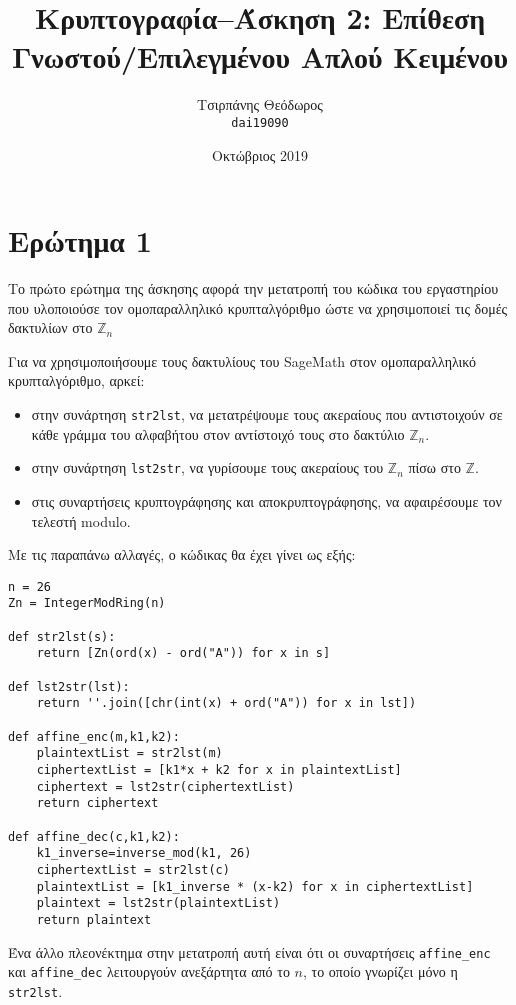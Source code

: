\documentclass{article}
\title{Κρυπτογραφία--Άσκηση 2: Επίθεση Γνωστού/Επιλεγμένου Απλού Κειμένου}
\author{Τσιρπάνης Θεόδωρος\\ \texttt{dai19090}}
\date{Οκτώβριος 2019}
\begin{document}
\maketitle

\section*{Ερώτημα 1}

Το πρώτο ερώτημα της άσκησης αφορά την μετατροπή του κώδικα του εργαστηρίου που υλοποιούσε τον ομοπαραλληλικό κρυπταλγόριθμο ώστε να χρησιμοποιεί τις δομές δακτυλίων στο $\mathbb{Z}_n$

Για να χρησιμοποιήσουμε τους δακτυλίους του SageMath στον ομοπαραλληλικό κρυπταλγόριθμο, αρκεί:

\begin{itemize}
\item στην συνάρτηση \lstinline|str2lst|, να μετατρέψουμε τους ακεραίους που αντιστοιχούν σε κάθε γράμμα του αλφαβήτου στον αντίστοιχό τους στο δακτύλιο $\mathbb{Z}_n$.

\item στην συνάρτηση \lstinline|lst2str|, να γυρίσουμε τους ακεραίους του $\mathbb{Z}_n$ πίσω στο $\mathbb{Z}$.

\item στις συναρτήσεις κρυπτογράφησης και αποκρυπτογράφησης, να αφαιρέσουμε τον τελεστή modulo.
\end{itemize}

Με τις παραπάνω αλλαγές, ο κώδικας θα έχει γίνει ως εξής:

\begin{lstlisting}
n = 26
Zn = IntegerModRing(n)

def str2lst(s):
    return [Zn(ord(x) - ord("A")) for x in s]

def lst2str(lst):
    return ''.join([chr(int(x) + ord("A")) for x in lst])

def affine_enc(m,k1,k2):
    plaintextList = str2lst(m)
    ciphertextList = [k1*x + k2 for x in plaintextList]
    ciphertext = lst2str(ciphertextList)
    return ciphertext

def affine_dec(c,k1,k2):
    k1_inverse=inverse_mod(k1, 26)
    ciphertextList = str2lst(c)
    plaintextList = [k1_inverse * (x-k2) for x in ciphertextList]
    plaintext = lst2str(plaintextList)
    return plaintext
\end{lstlisting}

Ένα άλλο πλεονέκτημα στην μετατροπή αυτή είναι ότι οι συναρτήσεις \lstinline|affine_enc| και \lstinline|affine_dec| λειτουργούν ανεξάρτητα από το $n$, το οποίο γνωρίζει μόνο η \lstinline|str2lst|.
\end{document}
